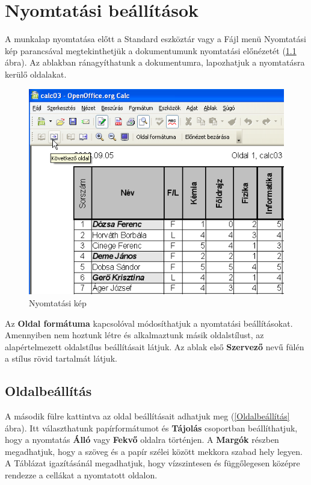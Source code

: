 \chapter{Nyomtatási beállítások}
\thispagestyle{empty}

A munkalap nyomtatása előtt a Standard eszköztár vagy a Fájl
menü Nyomtatási kép parancsával megtekinthetjük a
dokumentumunk nyomtatási előnézetét (\ref{NyomtatásiKép} ábra). Az
ablakban ránagyíthatunk a dokumentumra, lapozhatjuk a nyomtatásra
kerülő oldalakat.

\begin{figure}[!h]
\begin{center}
\includegraphics[width=12.52cm]{oocalcv1-img164.png}
\caption{Nyomtatási kép}\label{NyomtatásiKép}
\end{center}
\end{figure}

Az \textbf{Oldal formátuma} kapcsolóval módosíthatjuk a
nyomtatási beállításokat. Amennyiben nem hoztunk létre és
alkalmaztunk másik oldalstílust, az alapértelmezett oldalstílus
beállításait látjuk. Az ablak első \textbf{Szervező} nevű fülén a stílus
rövid tartalmát látjuk. 


\section{Oldalbeállítás}

A második fülre kattintva az oldal beállításait adhatjuk meg
(\ref{Oldalbeállítás} ábra). Itt választhatunk papírformátumot és
\textbf{Tájolás} csoportban beállíthatjuk, hogy a nyomtatás
\textbf{Álló} vagy \textbf{Fekvő} oldalra történjen. A
\textbf{Margók} részben megadhatjuk, hogy a szöveg és a papír
szélei között mekkora szabad hely legyen. A Táblázat
igazításánál megadhatjuk, hogy vízszintesen és
függőlegesen középre rendezze a cellákat a nyomtatott
oldalon.

